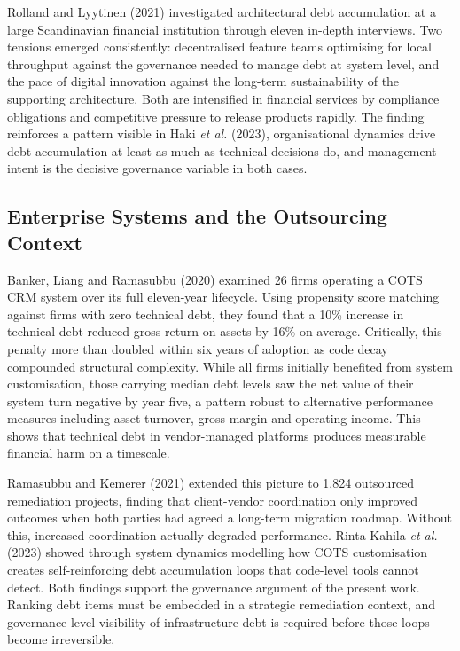 \documentclass[
  12pt,
  letterpaper,
  12pt,
  oneside,
  english,
  onehalfspacing,
  headsepline]{MastersDoctoralThesis}
\begin{document}
Rolland and Lyytinen (2021) investigated architectural debt accumulation
at a large Scandinavian financial institution through eleven in-depth
interviews. Two tensions emerged consistently: decentralised feature
teams optimising for local throughput against the governance needed to
manage debt at system level, and the pace of digital innovation against
the long-term sustainability of the supporting architecture. Both are
intensified in financial services by compliance obligations and
competitive pressure to release products rapidly. The finding reinforces
a pattern visible in Haki \emph{et al.} (2023), organisational dynamics
drive debt accumulation at least as much as technical decisions do, and
management intent is the decisive governance variable in both cases.

\subsection{Enterprise Systems and the Outsourcing
Context}\label{enterprise-systems-and-the-outsourcing-context}

Banker, Liang and Ramasubbu (2020) examined 26 firms operating a COTS
CRM system over its full eleven-year lifecycle. Using propensity score
matching against firms with zero technical debt, they found that a 10\%
increase in technical debt reduced gross return on assets by 16\% on
average. Critically, this penalty more than doubled within six years of
adoption as code decay compounded structural complexity. While all firms
initially benefited from system customisation, those carrying median
debt levels saw the net value of their system turn negative by year
five, a pattern robust to alternative performance measures including
asset turnover, gross margin and operating income. This shows that
technical debt in vendor-managed platforms produces measurable financial
harm on a timescale.

Ramasubbu and Kemerer (2021) extended this picture to 1,824 outsourced
remediation projects, finding that client-vendor coordination only
improved outcomes when both parties had agreed a long-term migration
roadmap. Without this, increased coordination actually degraded
performance. Rinta-Kahila \emph{et al.} (2023) showed through system
dynamics modelling how COTS customisation creates self-reinforcing debt
accumulation loops that code-level tools cannot detect. Both findings
support the governance argument of the present work. Ranking debt items
must be embedded in a strategic remediation context, and
governance-level visibility of infrastructure debt is required before
those loops become irreversible.
\end{document}
